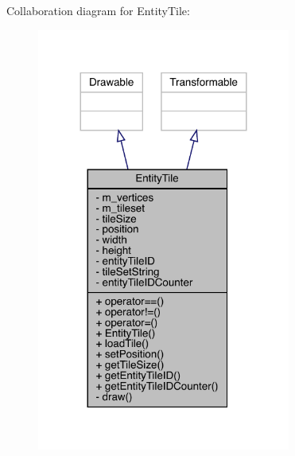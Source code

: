 Collaboration diagram for Entity\+Tile\+:
\nopagebreak
\begin{figure}[H]
\begin{center}
\leavevmode
\includegraphics[width=236pt]{d6/dc8/class_entity_tile__coll__graph}
\end{center}
\end{figure}

